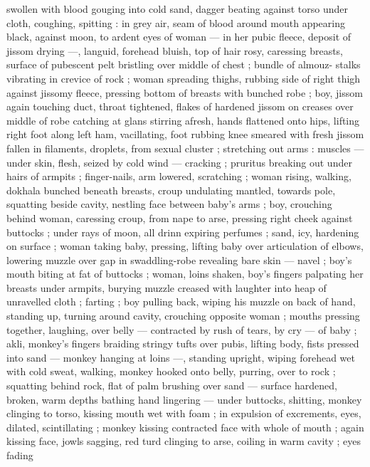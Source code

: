 swollen with blood gouging into cold sand, dagger beating against 
torso under cloth, coughing, spitting : in grey air, seam of blood 
around mouth appearing black, against moon, to ardent eyes of 
woman --- in her pubic fleece, deposit of jissom drying ---, languid, 
forehead bluish, top of hair rosy, caressing breasts, surface of 
pubescent pelt bristling over middle of chest ; bundle of almouz- 
stalks vibrating in crevice of rock ; woman spreading thighs, rubbing 
side of right thigh against jissomy fleece, pressing bottom of breasts 
with bunched robe ; boy, jissom again touching duct, throat 
tightened, flakes of hardened jissom on creases over middle of robe 
catching at glans stirring afresh, hands flattened onto hips, lifting 
right foot along left ham, vacillating, foot rubbing knee smeared with 
fresh jissom fallen in filaments, droplets, from sexual cluster ; 
stretching out arms : muscles --- under skin, flesh, seized by cold 
wind --- cracking ; pruritus breaking out under hairs of armpits ; 
finger-nails, arm lowered, scratching ; woman rising, walking, 
dokhala bunched beneath breasts, croup undulating mantled, 
towards pole, squatting beside cavity, nestling face between baby's 
arms ; boy, crouching behind woman, caressing croup, from nape to 
arse, pressing right cheek against buttocks ; under rays of moon, all 
drinn expiring perfumes ; sand, icy, hardening on surface ; woman 
taking baby, pressing, lifting baby over articulation of elbows, 
lowering muzzle over gap in swaddling-robe revealing bare skin --- 
navel ; boy's mouth biting at fat of buttocks ; woman, loins shaken, 
boy's fingers palpating her breasts under armpits, burying muzzle 
creased with laughter into heap of unravelled cloth ; farting ; boy 
pulling back, wiping his muzzle on back of hand, standing up, turning 
around cavity, crouching opposite woman ; mouths pressing together, 
laughing, over belly --- contracted by rush of tears, by cry --- of 
baby ; akli, monkey's fingers braiding stringy tufts over pubis, lifting 
body, fists pressed into sand --- monkey hanging at loins ---, 
standing upright, wiping forehead wet with cold sweat, walking, 
monkey hooked onto belly, purring, over to rock ; squatting behind 
rock, flat of palm brushing over sand --- surface hardened, broken, 
warm depths bathing hand lingering --- under buttocks, shitting, 
monkey clinging to torso, kissing mouth wet with foam ; in expulsion 
of excrements, eyes, dilated, scintillating ; monkey kissing 
contracted face with whole of mouth ; again kissing face, jowls 
sagging, red turd clinging to arse, coiling in warm cavity ; eyes fading 
